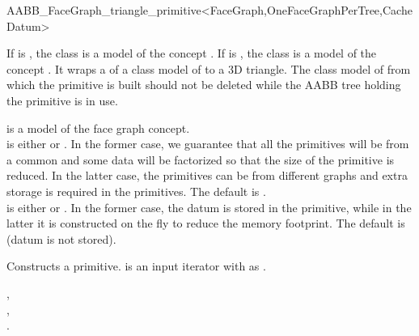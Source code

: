 \ccRefPageBegin

\begin{ccRefClass}{AABB_FaceGraph_triangle_primitive<FaceGraph,OneFaceGraphPerTree,CacheDatum>}

\ccDefinition
  
If  is , the class is a model of the concept .
If  is , the class  is a model of the concept .
It wraps a  of a class model of  to a 3D triangle.
The class model of  from which the primitive is built should not be deleted
while the AABB tree holding the primitive is in use.



\ccParameters
{} is a model of the face graph concept.\\
 is either  or . In the former case, we guarantee that all the primitives will be from a common  and some data 
will be factorized so that the size of the primitive is reduced. In the latter case, the primitives can be from different graphs and extra storage is required in the primitives. The default is .\\
 is either  or . In the former case, the datum is stored in the primitive, while in the latter it is constructed on the fly to reduce
the memory footprint. The default is  (datum is not stored).\\


\ccTypes
{}
\ccGlue
{}
\ccGlue
{}

\ccCreation
{}

{Constructs a primitive.  is an input iterator with  as .}


\ccSeeAlso

,\\
,\\
.\\

\end{ccRefClass}

\ccRefPageEnd
